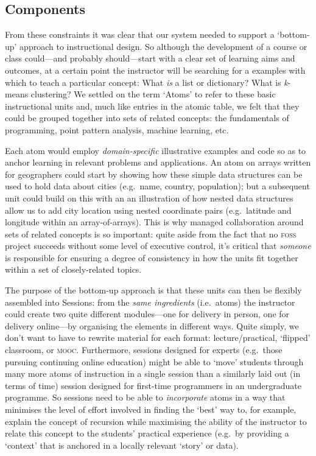 \documentclass[letter, 11pt]{article}
\newcommand{\eg}{e.g.~\/}
\newcommand{\ie}{i.e.~\/}
\begin{document}
\subsection{Components}\label{components}

From these constraints it was clear that our system needed to support a `bottom-up' approach to instructional design. So although the development of a course or class could---and probably should---start with a clear set of learning aims and outcomes, at a certain point the instructor will be searching for a examples with which to teach a particular concept: What \emph{is} a list or dictionary? What is \textit{k}-means clustering? We settled on the term `Atoms' to refer to these basic instructional units and, much like entries in the atomic table, we felt that they could be grouped together into sets of related concepts: the fundamentals of programming, point pattern analysis, machine learning, etc. 

Each atom would employ \emph{domain-specific} illustrative examples and code so as to anchor learning in relevant problems and applications. An atom on arrays written for geographers could start by showing how these simple data structures can be used to hold data about cities (\eg name, country, population); but a subsequent unit could build on this with an an illustration of how nested data structures allow us to add city location using nested coordinate pairs (\eg latitude and longitude within an array-of-arrays). This is why managed collaboration around sets of related concepts is so important: quite aside from the fact that no \textsc{foss} project succeeds without some level of executive control, it's critical that \textit{someone} is responsible for ensuring a degree of consistency in how the units fit together within a set of closely-related topics.

The purpose of the bottom-up approach is that these units can then be flexibly assembled into Sessions: from the \textit{same ingredients} (\ie atoms) the instructor could create two quite different modules---one for delivery in person, one for delivery online---by organising the elements in different ways. Quite simply, we don't want to have to rewrite material for each format: lecture/practical, `flipped' classroom, or \textsc{mooc}. Furthermore, sessions designed for experts (\eg those pursuing continuing online education) might be able to `move' students through many more atoms of instruction in a single session than a similarly laid out (in terms of time) session designed for first-time programmers in an undergraduate programme. So sessions need to be able to \emph{incorporate} atoms in a way that minimises the level of effort involved in finding the `best' way to, for example, explain the concept of recursion while maximising the ability of the instructor to relate this concept to the students' practical experience (\eg by providing a `context' that is anchored in a locally relevant `story' or data).
\end{document}
